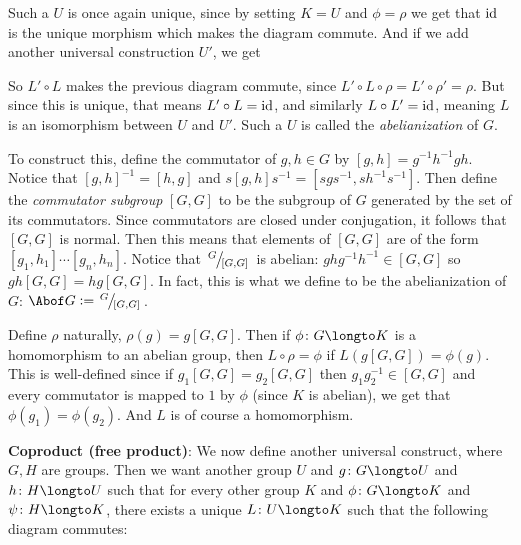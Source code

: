 \centerline{\def\diagcolwidth{1cm}\def\diagrowheight{.75cm}}

Such a $U$ is once again unique, since by setting $K=U$ and $\phi=\rho$ we get that ${\rm id}$ is the unique morphism which makes the diagram commute.
And if we add another universal construction $U'$, we get

\medskip
\centerline{\def\diagcolwidth{1cm}\def\diagrowheight{.75cm}}

So $L'\circ L$ makes the previous diagram commute, since $L'\circ L\circ \rho=L'\circ \rho'=\rho$.
But since this is unique, that means $L'\circ L={\rm id}$, and similarly $L\circ L'={\rm id}$, meaning $L$ is an isomorphism between $U$ and $U'$.
Such a $U$ is called the {\it abelianization} of $G$.

To construct this, define the commutator of $g,h\in G$ by $[g,h]=g^{-1}h^{-1}gh$.
Notice that $[g,h]^{-1}=[h,g]$ and $s[g,h]s^{-1}=[sgs^{-1},sh^{-1}s^{-1}]$.
Then define the {\it commutator subgroup} $[G,G]$ to be the subgroup of $G$ generated by the set of its commutators.
Since commutators are closed under conjugation, it follows that $[G,G]$ is normal.
Then this means that elements of $[G,G]$ are of the form $[g_1,h_1]\cdots[g_n,h_n]$.
Notice that $\slfrac G{[G,G]}$ is abelian: $ghg^{-1}h^{-1}\in[G,G]$ so $gh[G,G]=hg[G,G]$.
In fact, this is what we define to be the abelianization of $G$: $\Abof G\coloneqq\slfrac G{[G,G]}$.

Define $\rho$ naturally, $\rho(g)=g[G,G]$.
Then if $\phi\colon G\longto K$ is a homomorphism to an abelian group, then $L\circ\rho=\phi$ if $L(g[G,G])=\phi(g)$.
This is well-defined since if $g_1[G,G]=g_2[G,G]$ then $g_1g_2^{-1}\in[G,G]$ and every commutator is mapped to $1$ by $\phi$ (since $K$ is abelian), we get that $\phi(g_1)=\phi(g_2)$.
And $L$ is of course a homomorphism.

\medskip
{\bf Coproduct (free product)}:
We now define another universal construct, where $G,H$ are groups.
Then we want another group $U$ and $g\colon G\longto U$ and $h\colon H\longto U$ such that for every other group $K$ and $\phi\colon G\longto K$ and $\psi\colon H\longto K$, there exists a unique
$L\colon U\longto K$ such that the following diagram commutes:

